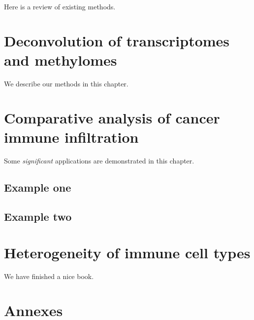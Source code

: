 \documentclass[12pt,]{book}
\theoremstyle{definition}
\theoremstyle{definition}
\theoremstyle{definition}
\theoremstyle{remark}
\begin{document}
Here is a review of existing methods.

\hypertarget{deconvolution-of-transcriptomes-and-methylomes}{%
\chapter{Deconvolution of transcriptomes and
methylomes}\label{deconvolution-of-transcriptomes-and-methylomes}}

We describe our methods in this chapter.

\hypertarget{comparative-analysis-of-cancer-immune-infiltration}{%
\chapter{Comparative analysis of cancer immune
infiltration}\label{comparative-analysis-of-cancer-immune-infiltration}}

Some \emph{significant} applications are demonstrated in this chapter.

\hypertarget{example-one}{%
\section{Example one}\label{example-one}}

\hypertarget{example-two}{%
\section{Example two}\label{example-two}}

\hypertarget{heterogeneity-of-immune-cell-types}{%
\chapter{Heterogeneity of immune cell
types}\label{heterogeneity-of-immune-cell-types}}

We have finished a nice book.

\hypertarget{annexes}{%
\chapter*{Annexes}\label{annexes}}


\end{document}

